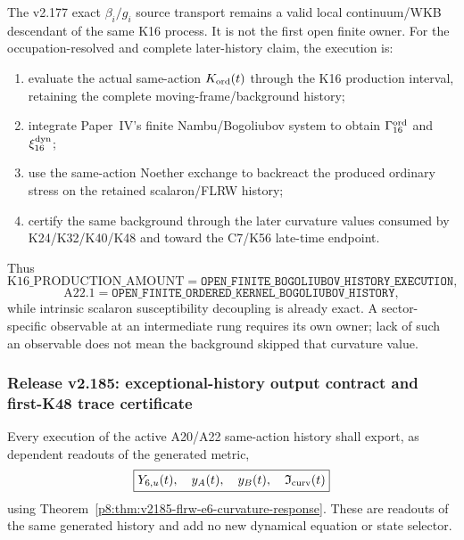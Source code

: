 \documentclass[12pt,a4paper]{article}
\begin{document}
\begin{corollary}
\label{p8:cor:v2178-c06-finite-frontier}
The v2.177 exact $\beta_i/g_i$ source transport remains a valid local
continuum/WKB descendant of the same K16 process.  It is not the first open
finite owner.  For the occupation-resolved and complete later-history claim, the execution is:
\begin{enumerate}
\item evaluate the actual same-action $K_{\rm ord}(t)$ through the K16
production interval, retaining the complete moving-frame/background history;
\item integrate Paper~IV's finite Nambu/Bogoliubov system to obtain
$\Gamma_{16}^{\rm ord}$ and $\xi_{16}^{\rm dyn}$;
\item use the same-action Noether exchange to backreact the produced ordinary
stress on the retained scalaron/FLRW history;
\item certify the same background through the later curvature values consumed
by K24/K32/K40/K48 and toward the C7/K56 late-time endpoint.
\end{enumerate}
Thus
\[
 \boxed{\mathrm{K16\_PRODUCTION\_AMOUNT}
 =\texttt{OPEN\_FINITE\_BOGOLIUBOV\_HISTORY\_EXECUTION}},
\]
\[
 \boxed{\mathrm{A22.1}
 =\texttt{OPEN\_FINITE\_ORDERED\_KERNEL\_BOGOLIUBOV\_HISTORY}},
\]
while intrinsic scalaron susceptibility decoupling is already exact.  A
sector-specific observable at an intermediate rung requires its own owner;
lack of such an observable does not mean the background skipped that curvature
value.
\end{corollary}

\subsubsection{Release v2.185: exceptional-history output contract and first-K48 trace certificate}
\label{p8:sec:v2185-c06-e6-output-contract}

\begin{corollary}
\label{p8:cor:v2185-c06-e6-output-contract}
Every execution of the active A20/A22 same-action history shall export, as
dependent readouts of the generated metric,
\[
 \boxed{Y_{6,u}(t),\quad y_A(t),\quad y_B(t),\quad
 \mathfrak I_{\rm curv}(t)}
\]
using Theorem~\ref{p8:thm:v2185-flrw-e6-curvature-response}.  These are
readouts of the same generated history and add no new dynamical equation or
state selector.
\end{corollary}
\end{document}
